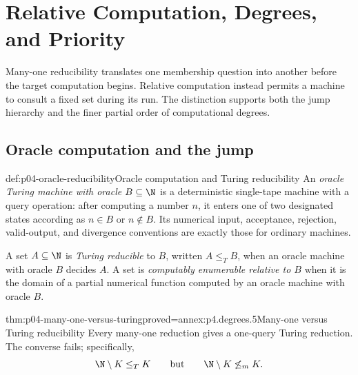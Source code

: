 
\chapter[Relative Computation and Degrees]{Relative Computation, Degrees, and Priority}
\label{sec:p04-degrees-priority}

Many-one reducibility translates one membership question into another before
the target computation begins.  Relative computation instead permits a
machine to consult a fixed set during its run.  The distinction supports both
the jump hierarchy and the finer partial order of computational degrees.

\section{Oracle computation and the jump}
\label{sec:p04-oracles-jump}

\begin{hbdefinition}{def:p04-oracle-reducibility}{Oracle computation and Turing reducibility}
An \emph{oracle Turing machine with oracle \(B\subseteq\N\)} is a
deterministic single-tape machine with a query operation: after computing a
number \(n\), it enters one of two designated states according as \(n\in B\)
or \(n\notin B\).  Its numerical input, acceptance, rejection, valid-output,
and divergence conventions are exactly those for ordinary machines.

A set \(A\subseteq\N\) is \emph{Turing reducible} to \(B\), written
\(A\leq_TB\), when an oracle machine with oracle \(B\) decides \(A\).  A set
is \emph{computably enumerable relative to \(B\)} when it is the domain of a
partial numerical function computed by an oracle machine with oracle \(B\).
\end{hbdefinition}

\begin{hblemma}{thm:p04-many-one-versus-turing}{proved=annex:p4.degrees.5}{Many-one versus Turing reducibility}
Every many-one reduction gives a one-query Turing reduction.  The converse
fails; specifically,
\[
  \N\setminus K\leq_TK
  \qquad\text{but}\qquad
  \N\setminus K\not\leq_mK.
\]
\end{hblemma}

